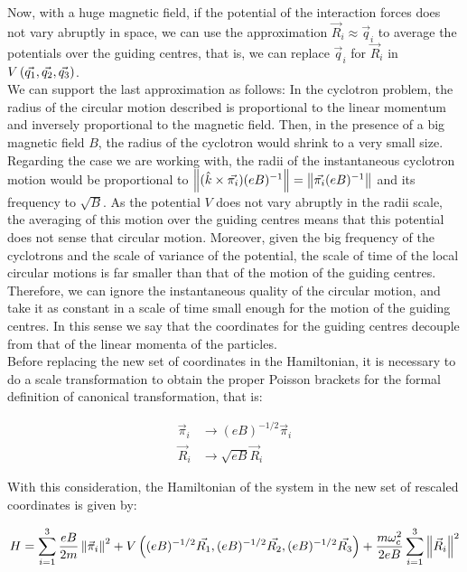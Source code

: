 Now, with a huge magnetic field, if the potential of the interaction forces does not vary abruptly in space, we can use the approximation $\vec{R}_i \approx \vec{q}_i$ to average the potentials over the guiding centres, that is, we can replace $\vec{q}_i$ for $\vec{R}_i$ in  $V \left(  \vec{q_1},\vec{q_2},\vec{q_3}  \right)$.\\

We can support the last approximation as follows: In the cyclotron problem, the radius of the circular motion described is proportional to the linear momentum and inversely proportional to the magnetic field. Then, in the presence of a big magnetic field $B$, the radius of the cyclotron would shrink to a very small size. Regarding the case we are working with, the radii of the instantaneous cyclotron motion would be proportional to $\left\lVert (\hat{k} \times \vec{\pi_i})(eB)^{-1} \right\rVert = \left\lVert \vec{\pi_i}(eB)^{-1} \right\rVert$ and its frequency to $\sqrt{B}$. As the potential $V$ does not vary abruptly in the radii scale, the averaging of this motion over the guiding centres means that this potential does not sense that circular motion. Moreover, given the big frequency of the cyclotrons and the scale of variance of the potential, the scale of time of the local circular motions is far smaller than that of the motion of the guiding centres. Therefore, we can ignore the instantaneous quality of the circular motion, and take it as constant in a scale of time small enough for the motion of the guiding centres. In this sense we say that the coordinates for the guiding centres decouple from that of the linear momenta of the particles.\\

Before replacing the new set of coordinates in the Hamiltonian, it is necessary to do a scale transformation to obtain the proper Poisson brackets for the formal definition of canonical transformation, that is:

\begin{align*}
\vec{\pi}_i & \rightarrow (eB)^{-1/2} \vec{ \pi}_i\\
\vec{R}_i & \rightarrow \sqrt{eB} \vec{R}_i
\end{align*}

With this consideration, the Hamiltonian of the system in the new set of rescaled coordinates is given by:

\begin{equation}
H = \sum_{i=1}^{3} \frac{eB}{2m} \left\lVert  \vec{\pi}_i \right\rVert^2
+ V\left(  (eB)^{-1/2}\vec{R_1},(eB)^{-1/2}\vec{R_2}, (eB)^{-1/2}\vec{R_3}  \right)
+\frac{m\omega_c^2}{2eB}\sum_{i=1}^{3} \left\lVert \vec{R}_i \right\rVert^2
\label{eq:newham}
\end{equation}

